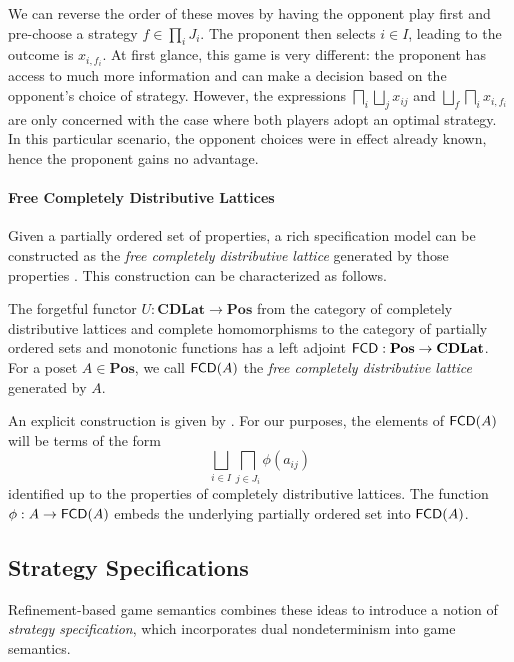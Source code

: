 \documentclass[acmsmall,review,anonymous]{acmart}\settopmatter{printfolios=true,printccs=false,printacmref=false}
\begin{document}
We can reverse the order of these moves
by having the opponent play first
and pre-choose a strategy $f \in \prod_i J_i$.
The proponent then selects $i \in I$,
leading to the outcome is $x_{i,f_i}$.
At first glance,
this game is very different:
the proponent has access to much more information
and can make a decision based on the opponent's choice of strategy.
However,
the expressions $\bigsqcap_i \bigsqcup_j x_{ij}$
and $\bigsqcup_f \bigsqcap_i x_{i,f_i}$
are only concerned with the case where both players adopt
an optimal strategy.
In this particular scenario,
the opponent choices were in effect already known,
hence the proponent gains no advantage.

\paragraph{Free Completely Distributive Lattices}

Given a partially ordered set of properties,
a rich specification model can be constructed as
the \emph{free completely distributive lattice}
generated by those properties \cite{augtyp,dndf}.
This construction can be characterized as follows.

\begin{definition}
The forgetful functor
$U : \mathbf{CDLat} \rightarrow \mathbf{Pos}$
from the category of completely distributive lattices
and complete homomorphisms
to the category of partially ordered sets
and monotonic functions
has a left adjoint
$ \mathsf{FCD}  : \mathbf{Pos} \rightarrow \mathbf{CDLat}$.
For a poset $A \in \mathbf{Pos}$,
we call $ \mathsf{FCD} (A)$ the \emph{free completely distributive lattice}
generated by $A$.
\end{definition}

An explicit construction is given by \citet{augtyp}.
For our purposes,
the elements of $ \mathsf{FCD} (A)$
will be terms of the form
\[
  \bigsqcup_{i \in I} \bigsqcap_{j \in J_i} \phi(a_{ij})
\]
identified up to the properties of completely distributive lattices.
The function $\phi : A \rightarrow  \mathsf{FCD} (A)$
embeds the underlying partially ordered set
into $ \mathsf{FCD} (A)$.


\subsection{Strategy Specifications} %

Refinement-based game semantics \cite{rbgs-cal}
combines these ideas to introduce a notion of
\emph{strategy specification},
which incorporates dual nondeterminism
into game semantics.
\end{document}
